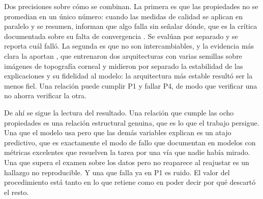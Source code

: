 Dos precisiones sobre cómo se combinan. La primera es que las propiedades no se promedian en un único número: cuando las medidas de calidad se aplican en paralelo y se resumen, informan que algo falla sin señalar dónde, que es la crítica documentada sobre su falta de convergencia \cite{vitexplain2024evaluation}. Se evalúan por separado y se reporta cuál falló. La segunda es que no son intercambiables, y la evidencia más clara la aportan \textcite{keratoconus2026instability}, que entrenaron dos arquitecturas con varias semillas sobre imágenes de topografía corneal y midieron por separado la estabilidad de las explicaciones y su fidelidad al modelo: la arquitectura más estable resultó ser la menos fiel. Una relación puede cumplir P1 y fallar P4, de modo que verificar una no ahorra verificar la otra.

De ahí se sigue la lectura del resultado. Una relación que cumple las ocho propiedades es una relación estructural genuina, que es lo que el trabajo persigue. Una que el modelo usa pero que las demás variables explican es un atajo predictivo, que es exactamente el modo de fallo que documentan \textcite{lapuschkin2019unmasking} en modelos con métricas excelentes que resuelven la tarea por una vía que nadie había mirado. Una que supera el examen sobre los datos pero no reaparece al reajustar es un hallazgo no reproducible. Y una que falla ya en P1 es ruido. El valor del procedimiento está tanto en lo que retiene como en poder decir por qué descartó el resto.
